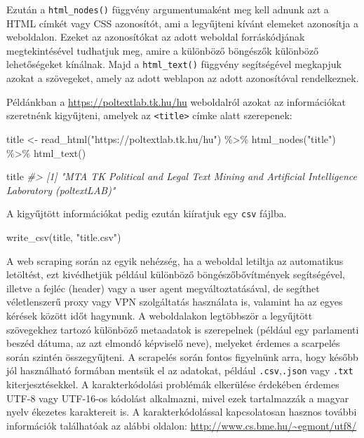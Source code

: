 \documentclass[
]{book}
\newenvironment{Shaded}{\begin{snugshade}}{\end{snugshade}}
\newcommand{\CommentTok}[1]{\textcolor[rgb]{0.56,0.35,0.01}{\textit{#1}}}
\newcommand{\FunctionTok}[1]{\textcolor[rgb]{0.00,0.00,0.00}{#1}}
\newcommand{\NormalTok}[1]{#1}
\newcommand{\OtherTok}[1]{\textcolor[rgb]{0.56,0.35,0.01}{#1}}
\newcommand{\SpecialCharTok}[1]{\textcolor[rgb]{0.00,0.00,0.00}{#1}}
\newcommand{\StringTok}[1]{\textcolor[rgb]{0.31,0.60,0.02}{#1}}
\begin{document}
Ezután a \texttt{html\_nodes()} függvény argumentumaként meg kell adnunk
azt a HTML címkét vagy CSS azonosítót, ami a legyűjteni kívánt elemeket
azonosítja a weboldalon. Ezeket az azonosítókat az adott weboldal
forráskódjának megtekintésével tudhatjuk meg, amire a különböző
böngészők különböző lehetőségeket kínálnak. Majd a \texttt{html\_text()}
függvény segítségével megkapjuk azokat a szövegeket, amely az adott
weblapon az adott azonosítóval rendelkeznek.

Példánkban a \url{https://poltextlab.tk.hu/hu} weboldalról azokat az
információkat szeretnénk kigyűjteni, amelyek az
\texttt{\textless{}title\textgreater{}} címke alatt szerepenek:

\begin{Shaded}
\begin{Highlighting}[]

\NormalTok{title }\OtherTok{\textless{}{-}} \FunctionTok{read\_html}\NormalTok{(}\StringTok{"https://poltextlab.tk.hu/hu"}\NormalTok{) }\SpecialCharTok{\%\textgreater{}\%} \FunctionTok{html\_nodes}\NormalTok{(}\StringTok{"title"}\NormalTok{) }\SpecialCharTok{\%\textgreater{}\%} \FunctionTok{html\_text}\NormalTok{()}


\NormalTok{title}
\CommentTok{\#\textgreater{} [1] "MTA TK Political and Legal Text Mining and Artificial Intelligence Laboratory (poltextLAB)"}
\end{Highlighting}
\end{Shaded}

A kigyűjtött információkat pedig ezután kiíratjuk egy \texttt{csv}
fájlba.

\begin{Shaded}
\begin{Highlighting}[]

\FunctionTok{write\_csv}\NormalTok{(title, }\StringTok{"title.csv"}\NormalTok{)}
\end{Highlighting}
\end{Shaded}

A web scraping során az egyik nehézség, ha a weboldal letiltja az
automatikus letöltést, ezt kivédhetjük például különböző
böngészőbővítmények segítségével, illetve a fejléc (header) vagy a user
agent megváltoztatásával, de segíthet véletlenszerű proxy vagy VPN
szolgáltatás használata is, valamint ha az egyes kérések között időt
hagynunk. A weboldalakon legtöbbször a legyűjtött szövegekhez tartozó
különböző metaadatok is szerepelnek (például egy parlamenti beszéd
dátuma, az azt elmondó képviselő neve), melyeket érdemes a scarpelés
során szintén összegyűjteni. A scrapelés során fontos figyelnünk arra,
hogy később jól használható formában mentsük el az adatokat, például
\texttt{.csv},\texttt{.json} vagy \texttt{.txt} kiterjesztésekkel. A
karakterkódolási problémák elkerülése érdekében érdemes UTF-8 vagy
UTF-16-os kódolást alkalmazni, mivel ezek tartalmazzák a magyar nyelv
ékezetes karaktereit is. A karakterkódolással kapcsolatosan hasznos
további információk találhatóak az alábbi oldalon:
\url{http://www.cs.bme.hu/~egmont/utf8/}
\end{document}

